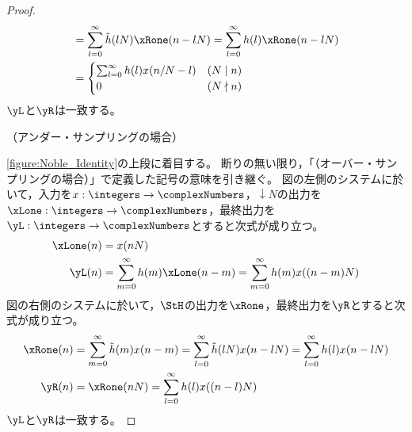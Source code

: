 \begin{proof}
\begin{align*}
                &= \sum_{l=0}^\infty \tilde{h}(lN)\xRone(n-lN) = \sum_{l=0}^\infty h(l)\xRone(n-lN) \\
                &= \begin{cases}
                    \sum_{l=0}^\infty h(l)x(n/N-l) & (N\mid n) \\
                    0 & (N\nmid n)
                \end{cases}
            \end{align*}
            $\yL$と$\yR$は一致する。
            \newline
            \quad\par\noindent
            （アンダー・サンプリングの場合）
            \par\noindent
            \cref{figure:Noble_Identity}の上段に着目する。
            断りの無い限り，「（オーバー・サンプリングの場合）」で定義した記号の意味を引き継ぐ。
            図の左側のシステムに於いて，入力を$x:\integers\to\complexNumbers$，$\downarrow N$の出力を$\xLone:\integers\to\complexNumbers$，最終出力を$\yL:\integers\to\complexNumbers$とすると次式が成り立つ。
            \begin{align*}
                \xLone(n) &= x(nN) \\
                \yL(n) &= \sum_{m=0}^\infty h(m)\xLone(n-m) = \sum_{m=0}^\infty h(m)x((n-m)N)
            \end{align*}
            図の右側のシステムに於いて，$\StH$の出力を$\xRone$，最終出力を$\yR$とすると次式が成り立つ。
            \begin{align*}
                \xRone(n) &= \sum_{m=0}^\infty \tilde{h}(m)x(n-m) = \sum_{l=0}^\infty \tilde{h}(lN)x(n-lN) = \sum_{l=0}^\infty h(l)x(n-lN) \\
                \yR(n) &= \xRone(nN) = \sum_{l=0}^\infty h(l)x((n-l)N)
            \end{align*}
            $\yL$と$\yR$は一致する。
        \end{proof}
